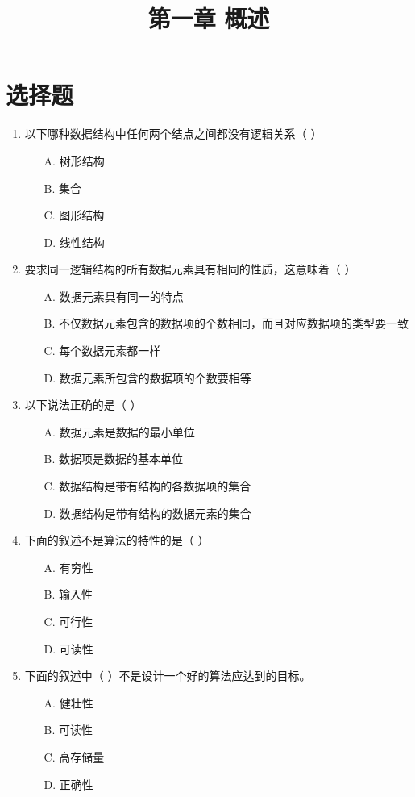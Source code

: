 \documentclass[12pt, a4paper]{article}
\title{\textbf{第一章 概述}}
\author{}
\date{}
\begin{document}
\section*{选择题}

\begin{enumerate}[label=\arabic*.]
	\item 以下哪种数据结构中任何两个结点之间都没有逻辑关系（ ）
	      \begin{enumerate}
		      \item[A.] 树形结构
		      \item[B.] 集合
		      \item[C.] 图形结构
		      \item[D.] 线性结构
	      \end{enumerate}

	\item 要求同一逻辑结构的所有数据元素具有相同的性质，这意味着（ ）
	      \begin{enumerate}
		      \item[A.] 数据元素具有同一的特点
		      \item[B.] 不仅数据元素包含的数据项的个数相同，而且对应数据项的类型要一致
		      \item[C.] 每个数据元素都一样
		      \item[D.] 数据元素所包含的数据项的个数要相等
	      \end{enumerate}

	\item 以下说法正确的是（ ）
	      \begin{enumerate}
		      \item[A.] 数据元素是数据的最小单位
		      \item[B.] 数据项是数据的基本单位
		      \item[C.] 数据结构是带有结构的各数据项的集合
		      \item[D.] 数据结构是带有结构的数据元素的集合
	      \end{enumerate}

	\item 下面的叙述不是算法的特性的是（ ）
	      \begin{enumerate}
		      \item[A.] 有穷性
		      \item[B.] 输入性
		      \item[C.] 可行性
		      \item[D.] 可读性
	      \end{enumerate}

	\item 下面的叙述中（ ）不是设计一个好的算法应达到的目标。
	      \begin{enumerate}
		      \item[A.] 健壮性
		      \item[B.] 可读性
		      \item[C.] 高存储量
		      \item[D.] 正确性
	      \end{enumerate}


\end{enumerate}
\end{document}
